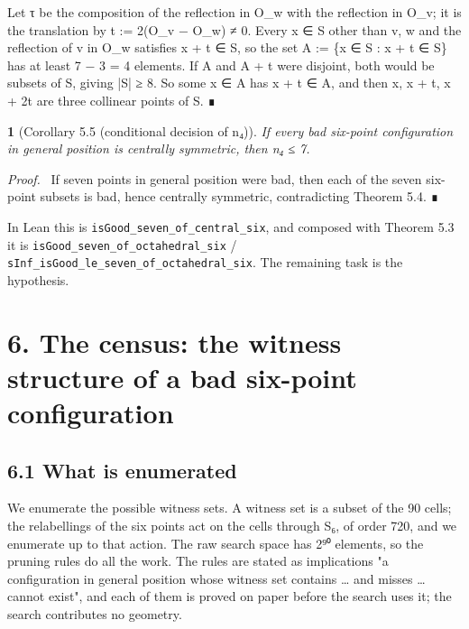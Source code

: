 \documentclass[11pt,a4paper]{article}
\theoremstyle{named}
\newtheorem*{namedthm}{}
\newenvironment{mdproof}[1][Proof]{\par\medskip\noindent\textit{#1.}\ }{\par\medskip}
\begin{document}
Let τ be the composition of the reflection in O\_w with the reflection in O\_v; it is the translation by t := 2(O\_v − O\_w) ≠ 0. Every x ∈ S other than v, w and the reflection of v in O\_w satisfies x + t ∈ S, so the set A := \{x ∈ S : x + t ∈ S\} has at least 7 − 3 = 4 elements. If A and A + t were disjoint, both would be subsets of S, giving |S| ≥ 8. So some x ∈ A has x + t ∈ A, and then x, x + t, x + 2t are three collinear points of S. ∎

\begin{namedthm}[Corollary 5.5 (conditional decision of n₄)]
If every bad six-point configuration in general position is centrally symmetric, then n₄ ≤ 7.
\end{namedthm}

\begin{mdproof}[Proof]
If seven points in general position were bad, then each of the seven six-point subsets is bad, hence centrally symmetric, contradicting Theorem 5.4. ∎
\end{mdproof}

In Lean this is \texttt{isGood\_\allowbreak{}seven\_\allowbreak{}of\_\allowbreak{}central\_\allowbreak{}six}, and composed with Theorem 5.3 it is \texttt{isGood\_\allowbreak{}seven\_\allowbreak{}of\_\allowbreak{}octahedral\_\allowbreak{}six} / \texttt{sInf\_\allowbreak{}isGood\_\allowbreak{}le\_\allowbreak{}seven\_\allowbreak{}of\_\allowbreak{}octahedral\_\allowbreak{}six}. The remaining task is the hypothesis.

\section*{6. The census: the witness structure of a bad six-point configuration}

\subsection*{6.1 What is enumerated}

We enumerate the possible witness sets. A witness set is a subset of the 90 cells; the relabellings of the six points act on the cells through S₆, of order 720, and we enumerate up to that action. The raw search space has 2⁹⁰ elements, so the pruning rules do all the work. The rules are stated as implications "a configuration in general position whose witness set contains … and misses … cannot exist", and each of them is proved on paper before the search uses it; the search contributes no geometry.
\end{document}
